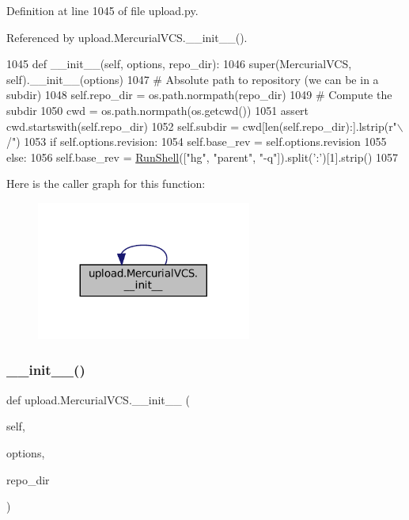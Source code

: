 Definition at line 1045 of file upload.\+py.



Referenced by upload.\+Mercurial\+V\+C\+S.\+\_\+\+\_\+init\+\_\+\+\_\+().


\begin{DoxyCode}
1045   \textcolor{keyword}{def }\_\_init\_\_(self, options, repo\_dir):
1046     super(MercurialVCS, self).\_\_init\_\_(options)
1047     \textcolor{comment}{# Absolute path to repository (we can be in a subdir)}
1048     self.repo\_dir = os.path.normpath(repo\_dir)
1049     \textcolor{comment}{# Compute the subdir}
1050     cwd = os.path.normpath(os.getcwd())
1051     \textcolor{keyword}{assert} cwd.startswith(self.repo\_dir)
1052     self.subdir = cwd[len(self.repo\_dir):].lstrip(\textcolor{stringliteral}{r"\(\backslash\)/"})
1053     \textcolor{keywordflow}{if} self.options.revision:
1054       self.base\_rev = self.options.revision
1055     \textcolor{keywordflow}{else}:
1056       self.base\_rev = \hyperlink{namespaceupload_adddc423c49132e8879cbb25d6be2cf11}{RunShell}([\textcolor{stringliteral}{"hg"}, \textcolor{stringliteral}{"parent"}, \textcolor{stringliteral}{"-q"}]).split(\textcolor{stringliteral}{':'})[1].strip()
1057 
\end{DoxyCode}
Here is the caller graph for this function\+:
\nopagebreak
\begin{figure}[H]
\begin{center}
\leavevmode
\includegraphics[width=200pt]{classupload_1_1MercurialVCS_a33890f442dedbb7d9fd45c08b5baed56_icgraph}
\end{center}
\end{figure}
\mbox{\label{classupload_1_1MercurialVCS_a33890f442dedbb7d9fd45c08b5baed56}} 
\subsubsection{\texorpdfstring{\+\_\+\+\_\+init\+\_\+\+\_\+()}{\_\_init\_\_()}\hspace{0.1cm}{\footnotesize\ttfamily [2/2]}}
{\footnotesize\ttfamily def upload.\+Mercurial\+V\+C\+S.\+\_\+\+\_\+init\+\_\+\+\_\+ (\begin{DoxyParamCaption}\item[{}]{self,  }\item[{}]{options,  }\item[{}]{repo\+\_\+dir }\end{DoxyParamCaption})}



